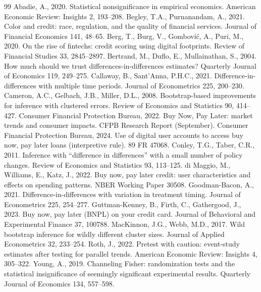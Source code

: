 \documentclass[12pt]{article}
\begin{document}
\begin{thebibliography}{99}
 Abadie, A., 2020. Statistical nonsignificance in empirical
economics. American Economic Review: Insights 2, 193--208.
 Begley, T.A., Purnanandam, A., 2021. Color
and credit: race, regulation, and the quality of financial services. Journal of Financial
Economics 141, 48--65.
 Berg, T., Burg, V., Gombovi\'c, A., Puri, M., 2020. On the
rise of fintechs: credit scoring using digital footprints. Review of Financial Studies 33,
2845--2897.
 Bertrand, M., Duflo, E., Mullainathan, S., 2004.
How much should we trust differences-in-differences estimates? Quarterly Journal of Economics
119, 249--275.
 Callaway, B., Sant'Anna, P.H.C., 2021.
Difference-in-differences with multiple time periods. Journal of Econometrics 225, 200--230.
 Cameron, A.C., Gelbach, J.B., Miller, D.L., 2008.
Bootstrap-based improvements for inference with clustered errors. Review of Economics and
Statistics 90, 414--427.
 Consumer Financial Protection Bureau, 2022. Buy Now, Pay Later:
market trends and consumer impacts. CFPB Research Report (September).
 Consumer Financial Protection Bureau, 2024. Use of digital user
accounts to access buy now, pay later loans (interpretive rule). 89 FR 47068.
 Conley, T.G., Taber, C.R., 2011. Inference with
``difference in differences'' with a small number of policy changes. Review of Economics and
Statistics 93, 113--125.
di Maggio, M., Williams, E., Katz, J., 2022. Buy now, pay later credit: user characteristics and effects on spending patterns. NBER Working Paper 30508.
 Goodman-Bacon, A., 2021.
Difference-in-differences with variation in treatment timing. Journal of Econometrics 225,
254--277.
 Guttman-Kenney, B., Firth, C., Gathergood, J.,
2023. Buy now, pay later (BNPL) on your credit card. Journal of Behavioral and Experimental
Finance 37, 100788.
 MacKinnon, J.G., Webb, M.D., 2017. Wild
bootstrap inference for wildly different cluster sizes. Journal of Applied Econometrics 32,
233--254.
 Roth, J., 2022. Pretest with caution: event-study estimates after
testing for parallel trends. American Economic Review: Insights 4, 305--322.
 Young, A., 2019. Channeling Fisher: randomization tests and the
statistical insignificance of seemingly significant experimental results. Quarterly Journal of
Economics 134, 557--598.
\end{thebibliography}
\end{document}
